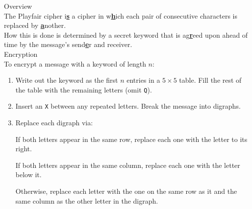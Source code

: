 \begin{minipage}{6cm}\raggedright
\textsf{\LARGE Overview}\\[1.0ex]

The Playfair cipher i\underline{\textbf{s}} a cipher in w\underline{\textbf{h}}ich each pair of consecutive characters is replaced by \underline{\textbf{a}}nother.\\[1.25ex]

How this is done is determined by a secret keyword that is ag\underline{\textbf{r}}eed upon ahead of time by the message's send\underline{\textbf{e}}r and receiver.\\[3ex] 

\textsf{\LARGE Encryption}\\[1.0ex]

To encrypt a message with a keyword of length $n$:
\begin{enumerate}[leftmargin=*]
	\item Write out the keyword as the first $n$ entries in a $5\times 5$ table. Fill the rest of the table with the remaining letters (omit \texttt{Q}).\\[1.25ex]
	\item Insert an \texttt{X} between any repeated letters. Break the message into digraphs.  %
	\item Replace each digraph via:
	
	If both letters appear in the same row, replace each one with the letter to its right.
	
	If both letters appear in the same column, replace each one with the letter below it.
	
	
	Otherwise, replace each letter with the one on the same row as it and the same column as the other letter in the digraph.
\end{enumerate}
%
%
%
%
%
%
\end{minipage}